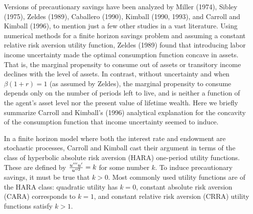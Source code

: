 Versions of precautionary savings have been analyzed by
Miller (1974), Sibley (1975), Zeldes (1989), Caballero (1990),
Kimball (1990, 1993), and Carroll and Kimball (1996),
 to mention just a few other studies in a vast literature.
Using numerical methods for a finite horizon savings problem
and assuming a constant relative risk aversion utility function,
Zeldes (1989) found that introducing
labor income uncertainty made the optimal consumption function
concave in assets. That is, the marginal propensity to
consume out of assets or transitory income declines with
the level of assets. In contrast, without uncertainty and when
$\beta (1+r)=1$ (as assumed by Zeldes),
the marginal propensity to consume depends only on the number of
periods left to live, and is neither a function
of the agent's asset level nor the present value of lifetime
wealth.
Here we briefly summarize Carroll and Kimball's (1996) analytical
explanation for the concavity of the consumption function that
income uncertainty seemed to induce.

In a finite horizon model where
both the interest rate and endowment are stochastic
processes, Carroll and Kimball
cast their argument in terms
of the class of hyperbolic absolute risk aversion (HARA)
%
one-period utility functions.  These are defined by ${u''' u'
\over u^{\prime \prime 2}} = k$ for some number $k$. To induce
precautionary savings, it must be true that $k >0$. Most commonly
used utility functions are of the HARA class: quadratic utility
has $k=0$, constant absolute risk aversion (CARA) corresponds to
$k=1$, and constant relative risk aversion (CRRA) utility
functions satisfy $k>1$. 

